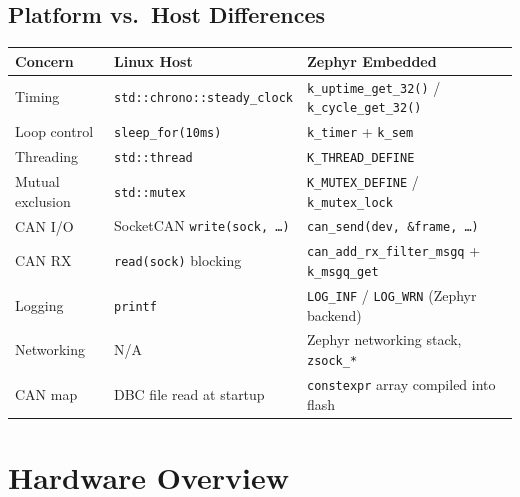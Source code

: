 \documentclass[11pt,a4paper]{article}
\begin{document}
\subsection{Platform vs.\ Host Differences}

\begin{center}
\begin{tabular}{lll}
\toprule
Concern & Linux Host & Zephyr Embedded \\
\midrule
Timing & \texttt{std::chrono::steady\_clock} & \texttt{k\_uptime\_get\_32()} / \texttt{k\_cycle\_get\_32()} \\
Loop control & \texttt{sleep\_for(10ms)} & \texttt{k\_timer} + \texttt{k\_sem} \\
Threading & \texttt{std::thread} & \texttt{K\_THREAD\_DEFINE} \\
Mutual exclusion & \texttt{std::mutex} & \texttt{K\_MUTEX\_DEFINE} / \texttt{k\_mutex\_lock} \\
CAN I/O & SocketCAN \texttt{write(sock, \ldots)} & \texttt{can\_send(dev, \&frame, \ldots)} \\
CAN RX & \texttt{read(sock)} blocking & \texttt{can\_add\_rx\_filter\_msgq} + \texttt{k\_msgq\_get} \\
Logging & \texttt{printf} & \texttt{LOG\_INF} / \texttt{LOG\_WRN} (Zephyr backend) \\
Networking & N/A & Zephyr networking stack, \texttt{zsock\_*} \\
CAN map & DBC file read at startup & \texttt{constexpr} array compiled into flash \\
\bottomrule
\end{tabular}
\end{center}

\section{Hardware Overview}
\end{document}
